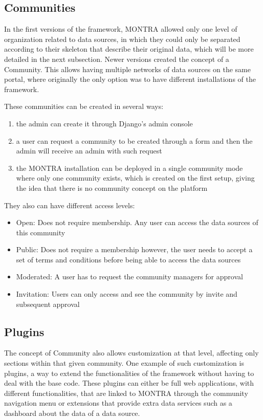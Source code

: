 \subsection{Communities}

In the first versions of the framework, MONTRA allowed only one level of organization related to data sources, in which they could only be separated according to their skeleton that describe their original data, which will be more detailed in the next subsection.
Newer versions created the concept of a Community.
This allows having multiple networks of data sources on the same portal, where originally the only option was to have different installations of the framework.

These communities can be created in several ways:

\begin{enumerate}
    \item the admin can create it through Django's admin console
    \item a user can request a community to be created through a form and then the admin will receive an admin with such request
    \item the MONTRA installation can be deployed in a single community mode where only one community exists, which is created on the first setup, giving the idea that there is no community concept on the platform
\end{enumerate}

They also can have different access levels:

\begin{itemize}
    \item Open: Does not require membership. Any user can access the data sources of this community
    \item Public: Does not require a membership however, the user needs to accept a set of terms and conditions before being able to access the data sources
    \item Moderated: A user has to request the community managers for approval
    \item Invitation: Users can only access and see the community by invite and subsequent approval
\end{itemize}

\subsection*{Plugins}
The concept of Community also allows customization at that level, affecting only sections within that given community.
One example of such customization is plugins, a way to extend the functionalities of the framework without having to deal with the base code.
These plugins can either be full web applications, with different functionalities, that are linked to MONTRA through the community navigation menu or extensions that provide extra data services such as a dashboard about the data of a data source.


